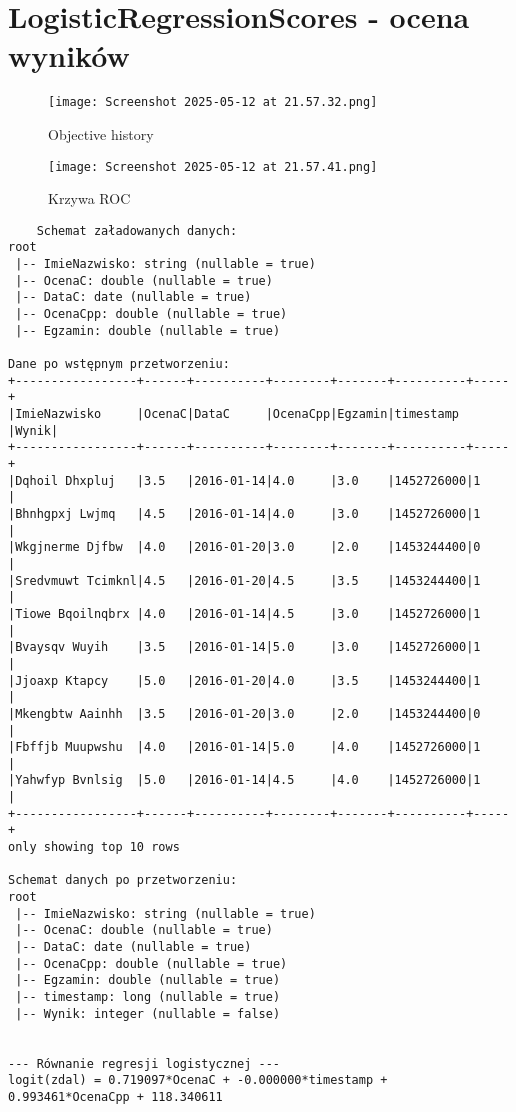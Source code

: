 \documentclass{article}
\begin{document}
\section{LogisticRegressionScores - ocena wyników}
\begin{figure}[H]
    \centering
    \texttt{[image: Screenshot 2025-05-12 at 21.57.32.png]}
    \caption{Objective history}
    \label{fig:enter-label}
\end{figure}
\begin{figure}[H]
    \centering
    \texttt{[image: Screenshot 2025-05-12 at 21.57.41.png]}
    \caption{Krzywa ROC}
    \label{fig:enter-label}
\end{figure}
\begin{verbatim}
    Schemat załadowanych danych:
root
 |-- ImieNazwisko: string (nullable = true)
 |-- OcenaC: double (nullable = true)
 |-- DataC: date (nullable = true)
 |-- OcenaCpp: double (nullable = true)
 |-- Egzamin: double (nullable = true)

Dane po wstępnym przetworzeniu:
+-----------------+------+----------+--------+-------+----------+-----+
|ImieNazwisko     |OcenaC|DataC     |OcenaCpp|Egzamin|timestamp |Wynik|
+-----------------+------+----------+--------+-------+----------+-----+
|Dqhoil Dhxpluj   |3.5   |2016-01-14|4.0     |3.0    |1452726000|1    |
|Bhnhgpxj Lwjmq   |4.5   |2016-01-14|4.0     |3.0    |1452726000|1    |
|Wkgjnerme Djfbw  |4.0   |2016-01-20|3.0     |2.0    |1453244400|0    |
|Sredvmuwt Tcimknl|4.5   |2016-01-20|4.5     |3.5    |1453244400|1    |
|Tiowe Bqoilnqbrx |4.0   |2016-01-14|4.5     |3.0    |1452726000|1    |
|Bvaysqv Wuyih    |3.5   |2016-01-14|5.0     |3.0    |1452726000|1    |
|Jjoaxp Ktapcy    |5.0   |2016-01-20|4.0     |3.5    |1453244400|1    |
|Mkengbtw Aainhh  |3.5   |2016-01-20|3.0     |2.0    |1453244400|0    |
|Fbffjb Muupwshu  |4.0   |2016-01-14|5.0     |4.0    |1452726000|1    |
|Yahwfyp Bvnlsig  |5.0   |2016-01-14|4.5     |4.0    |1452726000|1    |
+-----------------+------+----------+--------+-------+----------+-----+
only showing top 10 rows

Schemat danych po przetworzeniu:
root
 |-- ImieNazwisko: string (nullable = true)
 |-- OcenaC: double (nullable = true)
 |-- DataC: date (nullable = true)
 |-- OcenaCpp: double (nullable = true)
 |-- Egzamin: double (nullable = true)
 |-- timestamp: long (nullable = true)
 |-- Wynik: integer (nullable = false)


--- Równanie regresji logistycznej ---
logit(zdal) = 0.719097*OcenaC + -0.000000*timestamp + 0.993461*OcenaCpp + 118.340611


\end{verbatim}
\end{document}
